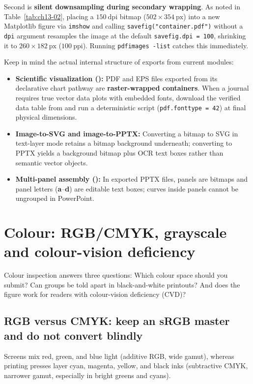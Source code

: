 Second is \textbf{silent downsampling during secondary wrapping}. As noted in Table~\ref{tab:ch13-02}, placing a $150\ \text{dpi}$ bitmap ($502 \times 354\ \text{px}$) into a new Matplotlib figure via \texttt{imshow} and calling \texttt{savefig("container.pdf")} without a \texttt{dpi} argument resamples the image at the default \texttt{savefig.dpi = 100}, shrinking it to $260 \times 182\ \text{px}$ ($100\ \text{ppi}$). Running \texttt{pdfimages -list} catches this immediately.

Keep in mind the actual internal structure of exports from current \scidraw{} modules:
\begin{itemize}
\item \textbf{Scientific visualization ():} PDF and EPS files exported from its declarative chart pathway are \textbf{raster-wrapped containers}. When a journal requires true vector data plots with embedded fonts, download the verified data table from  and run a deterministic script (\texttt{pdf.fonttype = 42}) at final physical dimensions.
\item \textbf{Image-to-SVG and image-to-PPTX:} Converting a bitmap to SVG in text-layer mode retains a bitmap background underneath; converting to PPTX yields a background bitmap plus OCR text boxes rather than semantic vector objects.
\item \textbf{Multi-panel assembly ():} In exported PPTX files, panels are bitmaps and panel letters (\textbf{a}--\textbf{d}) are editable text boxes; curves inside panels cannot be ungrouped in PowerPoint.
\end{itemize}

\section{Colour: RGB/CMYK, grayscale and colour-vision deficiency}

Colour inspection answers three questions: Which colour space should you submit? Can groups be told apart in black-and-white printouts? And does the figure work for readers with colour-vision deficiency (CVD)?

\subsection*{RGB versus CMYK: keep an sRGB master and do not convert blindly}

Screens mix red, green, and blue light (additive RGB, wide gamut), whereas printing presses layer cyan, magenta, yellow, and black inks (subtractive CMYK, narrower gamut, especially in bright greens and cyans).

